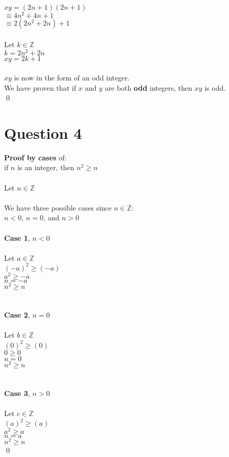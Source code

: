 \documentclass{article}
\begin{document}
    $xy = (2n + 1)(2n + 1)$ \\ 
    $\equiv 4n^2 + 4n + 1$ \\
    $\equiv 2(2n^2 + 2n) + 1$\\ \\
    Let $k \in \mathbb{Z}$ \\
    $k = 2n^2 + 2n$ \\
    $xy = 2k + 1$ \\ \\
    $xy$ is now in the form of an odd integer. \\
    We have proven that if $x$ and $y$ are both \textbf{odd} integers, then $xy$ is odd.  \\ \qed
    
    \newpage
    \section*{Question 4}
    \textbf{Proof by cases} of: \\
    \indent if $n$ is an integer, then $n^2 \geq n$ \\ \\
    Let $n \in \mathbb{Z}$ \\ \\
    We have three possible cases since $n \in \mathbb{Z}$: \\
    \indent $n < 0$, $n = 0$, and $n > 0$ \\ \\
    \textbf{Case 1}, $n < 0$ \\ \\
    \indent Let $a \in \mathbb{Z}$ \\
    \indent $(-a)^2 \geq (-a)$ \\
    \indent $a^2 \geq -a$ \\ 
    \indent $n = -a$ \\
    \indent $n^2 \geq n$ \\ \\ \\
    \textbf{Case 2}, $n = 0$ \\ \\
    \indent Let $b \in \mathbb{Z}$ \\
    \indent $(0)^2 \geq (0)$ \\
    \indent $0 \geq 0$ \\ 
    \indent $n = 0$ \\
    \indent $n^2 \geq n$ \\ \\ \\
    \textbf{Case 3}, $n > 0$ \\ \\
    \indent Let $c \in \mathbb{Z}$ \\
    \indent $(a)^2 \geq (a)$ \\
    \indent $a^2 \geq a$ \\ 
    \indent $n = a$ \\
    \indent $n^2 \geq n$  \\ \qed
    
\end{document}
